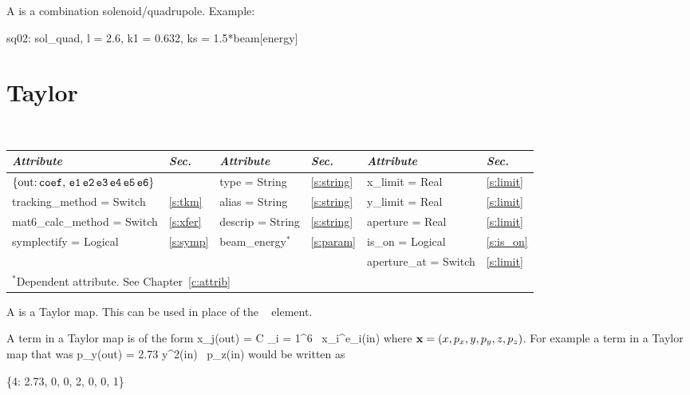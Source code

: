 {{A  is a combination solenoid/quadrupole.
Example:
\begin{example}
  sq02: sol_quad, l = 2.6, k1 = 0.632, ks = 1.5*beam[energy]
\end{example}

\section{Taylor}
\label{s:tay}

\begin{center}
\tt
\begin{tabular}{|l|l||l|l||l|l|} \hline
  {\sl Attribute} & {\sl Sec.}  & {\sl Attribute} & {\sl Sec.} & {\sl Attribute} & {\sl Sec.} \\ \hline
  $\{ \tt \mbox{out:}\,  coef, \, e1 \, e2 \, e3 \, e4 \, e5 \, e6 \}$ 
                              &              & type = String    & \ref{s:string} & x\_limit = Real       & \ref{s:limit} \\ \hline  
  tracking\_method = Switch   & \ref{s:tkm}  & alias = String   & \ref{s:string} & y\_limit = Real       & \ref{s:limit} \\ \hline
  mat6\_calc\_method = Switch & \ref{s:xfer} & descrip = String & \ref{s:string} & aperture = Real       & \ref{s:limit} \\ \hline
  symplectify = Logical       & \ref{s:symp} & beam\_energy$^*$ & \ref{s:param}  & is\_on = Logical      & \ref{s:is_on} \\ \hline
                              &              &                  &                & aperture\_at = Switch & \ref{s:limit} \\ \hline
  \multicolumn{6}{l}{\small $^*$Dependent attribute. See Chapter~\ref{c:attrib}} \\
\end{tabular}
\end{center}
\toffset

A  is a Taylor map. This can be used in place of the \mad\ 
 element.

A term in a Taylor map is of the form
\Begineq
  x_j({\rm out}) = C \cdot \Pi_{i = 1}^6 \, x_i^{e_i}({\rm in})
\Endeq
where ${\bf x} = (x, p_x, y, p_y, z, p_z)$. For example a term
in a Taylor map that was
\Begineq
  p_y({\rm out}) = 2.73 \cdot y^2({\rm in}) \, p_z({\rm in})
\Endeq
would be written as
\begin{example}
  \{4: 2.73, 0, 0, 2, 0, 0, 1\}
\end{example}

}}
